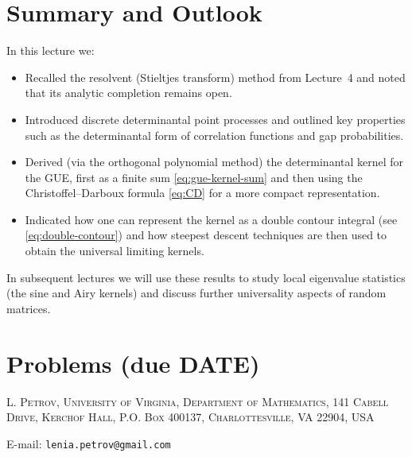 \documentclass[letterpaper,11pt,oneside,reqno]{article}
\numberwithin{equation}{section}
\theoremstyle{definition}
\begin{document}
\section{Summary and Outlook}
In this lecture we:
\begin{itemize}
  \item Recalled the resolvent (Stieltjes transform) method from Lecture~4 and noted that its analytic completion remains open.
  \item Introduced discrete determinantal point processes and outlined key properties such as the determinantal form of correlation functions and gap probabilities.
  \item Derived (via the orthogonal polynomial method) the determinantal kernel for the GUE, first as a finite sum \eqref{eq:gue-kernel-sum} and then using the Christoffel--Darboux formula \eqref{eq:CD} for a more compact representation.
  \item Indicated how one can represent the kernel as a double contour integral (see \eqref{eq:double-contour}) and how steepest descent techniques are then used to obtain the universal limiting kernels.
\end{itemize}

In subsequent lectures we will use these results to study local eigenvalue statistics (the sine and Airy kernels) and discuss further universality aspects of random matrices.































\appendix
\setcounter{section}{4}

\section{Problems (due DATE)}









\medskip

\textsc{L. Petrov, University of Virginia, Department of Mathematics, 141 Cabell Drive, Kerchof Hall, P.O. Box 400137, Charlottesville, VA 22904, USA}

E-mail: \texttt{lenia.petrov@gmail.com}
\end{document}

